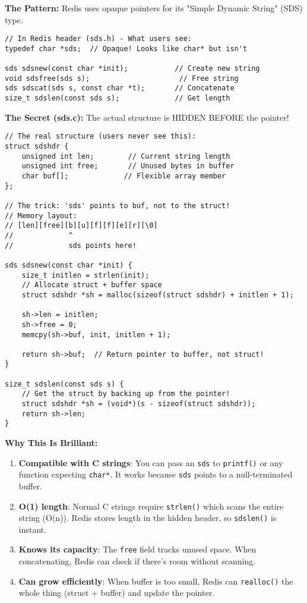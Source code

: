 \textbf{The Pattern:} Redis uses opaque pointers for its "Simple Dynamic String" (SDS) type.

\begin{lstlisting}
// In Redis header (sds.h) - What users see:
typedef char *sds;  // Opaque! Looks like char* but isn't

sds sdsnew(const char *init);           // Create new string
void sdsfree(sds s);                     // Free string
sds sdscat(sds s, const char *t);       // Concatenate
size_t sdslen(const sds s);             // Get length
\end{lstlisting}

\textbf{The Secret (sds.c):} The actual structure is HIDDEN BEFORE the pointer!

\begin{lstlisting}
// The real structure (users never see this):
struct sdshdr {
    unsigned int len;        // Current string length
    unsigned int free;       // Unused bytes in buffer
    char buf[];             // Flexible array member
};

// The trick: 'sds' points to buf, not to the struct!
// Memory layout:
// [len][free][b][u][f][f][e][r][\0]
//             ^
//             sds points here!

sds sdsnew(const char *init) {
    size_t initlen = strlen(init);
    // Allocate struct + buffer space
    struct sdshdr *sh = malloc(sizeof(struct sdshdr) + initlen + 1);

    sh->len = initlen;
    sh->free = 0;
    memcpy(sh->buf, init, initlen + 1);

    return sh->buf;  // Return pointer to buffer, not struct!
}

size_t sdslen(const sds s) {
    // Get the struct by backing up from the pointer!
    struct sdshdr *sh = (void*)(s - sizeof(struct sdshdr));
    return sh->len;
}
\end{lstlisting}

\textbf{Why This Is Brilliant:}

\begin{enumerate}
    \item \textbf{Compatible with C strings}: You can pass an \texttt{sds} to \texttt{printf()} or any function expecting \texttt{char*}. It works because \texttt{sds} points to a null-terminated buffer.

    \item \textbf{O(1) length}: Normal C strings require \texttt{strlen()} which scans the entire string (O(n)). Redis stores length in the hidden header, so \texttt{sdslen()} is instant.

    \item \textbf{Knows its capacity}: The \texttt{free} field tracks unused space. When concatenating, Redis can check if there's room without scanning.

    \item \textbf{Can grow efficiently}: When buffer is too small, Redis can \texttt{realloc()} the whole thing (struct + buffer) and update the pointer.
\end{enumerate}

